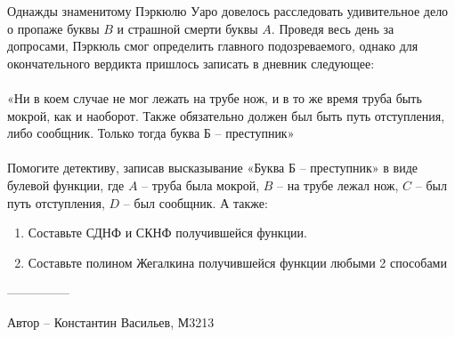 \question
Однажды знаменитому Пэркюлю Уаро довелось расследовать удивительное дело о пропаже буквы $B$ и страшной смерти буквы $A$. Проведя весь день за допросами, Пэркюль смог определить главного подозреваемого, однако для окончательного вердикта пришлось записать в дневник следующее:
\\
\\
«Ни в коем случае не мог лежать на трубе нож, и в то же время труба быть мокрой, как и наоборот. Также обязательно должен был быть путь отступления, либо сообщник. Только тогда буква Б – преступник»
\\
\\
Помогите детективу, записав высказывание «Буква Б – преступник» в виде булевой функции, где $A$ – труба была мокрой, $B$ – на трубе лежал нож, $C$ – был путь отступления, $D$ – был сообщник. А также:
\begin{enumerate}
    \item Составьте СДНФ и СКНФ получившейся функции.
    \item Составьте полином Жегалкина получившейся функции любыми 2 способами
\end{enumerate}

---------------

Автор -- Константин Васильев, М3213